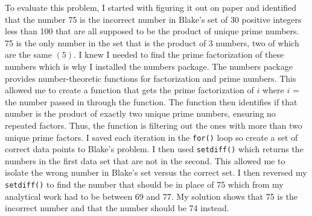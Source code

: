 \documentclass{article}\usepackage[]{graphicx}\usepackage[]{xcolor}
\begin{document}
To evaluate this problem, I started with figuring it out on paper and identified that the number 75 is the incorrect number in Blake's set of 30 positive integers less than 100 that are all supposed to be the product of unique prime numbers. 75 is the only number in the set that is the product of 3 numbers, two of which are the same $(5)$. I knew I needed to find the prime factorization of these numbers which is why I installed the numbers package. The numbers package provides number-theoretic functions for factorization and prime numbers\citep{numberpackage}. This allowed me to create a function that gets the prime factorization of $i$ where $i$ = the number passed in through the function. The function then identifies if that number is the product of exactly two unique prime numbers, ensuring no repeated factors. Thus, the function is filtering out the ones with more than two unique prime factors. I saved each iteration in the \texttt{for()} loop so create a set of correct data points to Blake's problem. I then used \texttt{setdiff()} which returns the numbers in the first data set that are not in the second. This allowed me to isolate the wrong number in Blake's set versus the correct set. I then reversed my \texttt{setdiff()} to find the number that should be in place of 75 which from my analytical work had to be between 69 and 77. My solution shows that 75 is the incorrect number and that the number should be 74 instead. 


\end{document}
